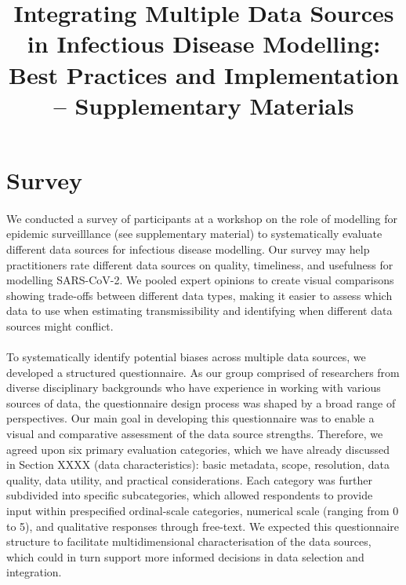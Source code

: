 \documentclass{article}
\title{Integrating Multiple Data Sources in Infectious Disease Modelling: Best Practices and Implementation -- Supplementary Materials}
\begin{document}
\maketitle

\section{Survey}
\paragraph{}We conducted a survey of participants at a workshop on the role of modelling for epidemic surveilllance (see supplementary material) to systematically evaluate different data sources for infectious disease modelling.
Our survey may help practitioners rate different data sources on quality, timeliness, and usefulness for modelling SARS-CoV-2. We pooled expert opinions to create visual comparisons showing trade-offs between different data types, making it easier to assess which data to use when estimating transmissibility and identifying when different data sources might conflict.

\paragraph{}To systematically identify potential biases across multiple data sources, we developed a structured questionnaire. As our group comprised of researchers from diverse disciplinary backgrounds who have experience in working with various sources of data, the questionnaire design process was shaped by a broad range of perspectives. Our main goal in developing this questionnaire was to enable a visual and comparative assessment of the data source strengths. Therefore, we agreed upon six primary evaluation categories, which we have already discussed in Section XXXX (data characteristics): basic metadata, scope, resolution, data quality, data utility, and practical considerations. Each category was further subdivided into specific subcategories, which allowed respondents to provide input within prespecified ordinal-scale categories, numerical scale (ranging from 0 to 5), and qualitative responses through free-text. We expected this questionnaire structure to facilitate multidimensional characterisation of the data sources, which could in turn support more informed decisions in data selection and integration. 
\end{document}

